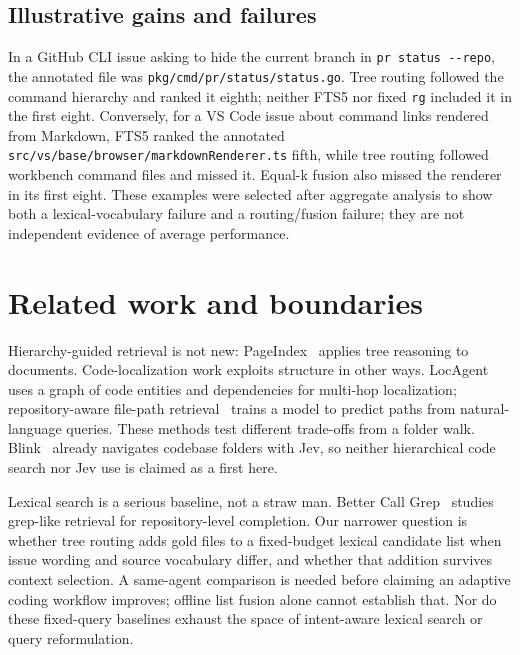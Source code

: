 \documentclass[
]{article}
\begin{document}
\subsection{Illustrative gains and
failures}\label{illustrative-gains-and-failures}

In a GitHub CLI issue asking to hide the current branch in
\texttt{pr\ status\ -\/-repo}, the annotated file was
\texttt{pkg/cmd/pr/status/status.go}. Tree routing followed the command
hierarchy and ranked it eighth; neither FTS5 nor fixed \texttt{rg}
included it in the first eight. Conversely, for a VS Code issue about
command links rendered from Markdown, FTS5 ranked the annotated
\texttt{src/vs/base/browser/markdownRenderer.ts} fifth, while tree
routing followed workbench command files and missed it. Equal-k fusion
also missed the renderer in its first eight. These examples were
selected after aggregate analysis to show both a lexical-vocabulary
failure and a routing/fusion failure; they are not independent evidence
of average performance.

\section{Related work and boundaries}\label{related-work-and-boundaries}

Hierarchy-guided retrieval is not new:
PageIndex~\cite{pageindex} applies tree
reasoning to documents. Code-localization work exploits structure in
other ways. LocAgent~\cite{chen2025locagent}
uses a graph of code entities and dependencies for multi-hop
localization; repository-aware
file-path retrieval~\cite{yanuganti2025paths} trains a model to predict paths from
natural-language queries. These methods test different trade-offs from a
folder walk. Blink~\cite{blink} already
navigates codebase folders with Jev, so neither hierarchical code search
nor Jev use is claimed as a first here.

Lexical search is a serious baseline, not a straw man.
Better Call Grep~\cite{wang2026grep} studies
grep-like retrieval for repository-level completion. Our narrower
question is whether tree routing adds gold files to a fixed-budget
lexical candidate list when issue wording and source vocabulary differ,
and whether that addition survives context selection. A same-agent
comparison is needed before claiming an adaptive coding workflow
improves; offline list fusion alone cannot establish that. Nor do these
fixed-query baselines exhaust the space of intent-aware lexical search
or query reformulation.
\end{document}
